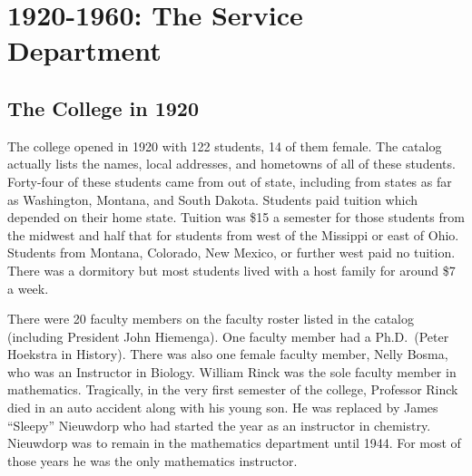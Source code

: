\documentclass[
]{book}
\begin{document}
\hypertarget{the-service-department}{%
\chapter{1920-1960: The Service Department}\label{the-service-department}}

\hypertarget{the-college-in-1920}{%
\section{The College in 1920}\label{the-college-in-1920}}

The college opened in 1920 with 122 students, 14 of them female. The catalog actually lists the names, local addresses, and hometowns of all of these students. Forty-four of these students came from out of state, including from states as far as Washington, Montana, and South Dakota. Students paid tuition which depended on their home state. Tuition was \$15 a semester for those students from the midwest and half that for students from west of the Missippi or east of Ohio. Students from Montana, Colorado, New Mexico, or further west paid no tuition. There was a dormitory but most students lived with a host family for around \$7 a week.

There were 20 faculty members on the faculty roster listed in the catalog (including President John Hiemenga). One faculty member had a Ph.D.~(Peter Hoekstra in History). There was also one female faculty member, Nelly Bosma, who was an Instructor in Biology. William Rinck was the sole faculty member in mathematics. Tragically, in the very first semester of the college, Professor Rinck died in an auto accident along with his young son. He was replaced by James ``Sleepy'' Nieuwdorp who had started the year as an instructor in chemistry. Nieuwdorp was to remain in the mathematics department until 1944. For most of those years he was the only mathematics instructor.
\end{document}
